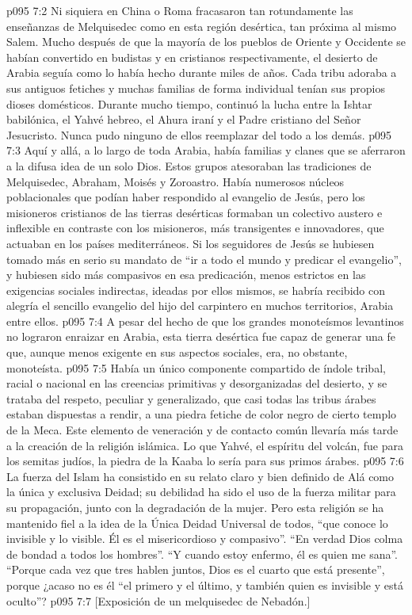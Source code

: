 \vs p095 7:2 Ni siquiera en China o Roma fracasaron tan rotundamente las enseñanzas de Melquisedec como en esta región desértica, tan próxima al mismo Salem. Mucho después de que la mayoría de los pueblos de Oriente y Occidente se habían convertido en budistas y en cristianos respectivamente, el desierto de Arabia seguía como lo había hecho durante miles de años. Cada tribu adoraba a sus antiguos fetiches y muchas familias de forma individual tenían sus propios dioses domésticos. Durante mucho tiempo, continuó la lucha entre la Ishtar babilónica, el Yahvé hebreo, el Ahura iraní y el Padre cristiano del Señor Jesucristo. Nunca pudo ninguno de ellos reemplazar del todo a los demás.
\vs p095 7:3 Aquí y allá, a lo largo de toda Arabia, había familias y clanes que se aferraron a la difusa idea de un solo Dios. Estos grupos atesoraban las tradiciones de Melquisedec, Abraham, Moisés y Zoroastro. Había numerosos núcleos poblacionales que podían haber respondido al evangelio de Jesús, pero los misioneros cristianos de las tierras desérticas formaban un colectivo austero e inflexible en contraste con los misioneros, más transigentes e innovadores, que actuaban en los países mediterráneos. Si los seguidores de Jesús se hubiesen tomado más en serio su mandato de “ir a todo el mundo y predicar el evangelio”, y hubiesen sido más compasivos en esa predicación, menos estrictos en las exigencias sociales indirectas, ideadas por ellos mismos, se habría recibido con alegría el sencillo evangelio del hijo del carpintero en muchos territorios, Arabia entre ellos.
\vs p095 7:4 A pesar del hecho de que los grandes monoteísmos levantinos no lograron enraizar en Arabia, esta tierra desértica fue capaz de generar una fe que, aunque menos exigente en sus aspectos sociales, era, no obstante, monoteísta.
\vs p095 7:5 Había un único componente compartido de índole tribal, racial o nacional en las creencias primitivas y desorganizadas del desierto, y se trataba del respeto, peculiar y generalizado, que casi todas las tribus árabes estaban dispuestas a rendir, a una piedra fetiche de color negro de cierto templo de la Meca. Este elemento de veneración y de contacto común llevaría más tarde a la creación de la religión islámica. Lo que Yahvé, el espíritu del volcán, fue para los semitas judíos, la piedra de la Kaaba lo sería para sus primos árabes.
\vs p095 7:6 La fuerza del Islam ha consistido en su relato claro y bien definido de Alá como la única y exclusiva Deidad; su debilidad ha sido el uso de la fuerza militar para su propagación, junto con la degradación de la mujer. Pero esta religión se ha mantenido fiel a la idea de la Única Deidad Universal de todos, “que conoce lo invisible y lo visible. Él es el misericordioso y compasivo”. “En verdad Dios colma de bondad a todos los hombres”. “Y cuando estoy enfermo, él es quien me sana”. “Porque cada vez que tres hablen juntos, Dios es el cuarto que está presente”, porque ¿acaso no es él “el primero y el último, y también quien es invisible y está oculto”?
\vsetoff
\vs p095 7:7 [Exposición de un melquisedec de Nebadón.]
